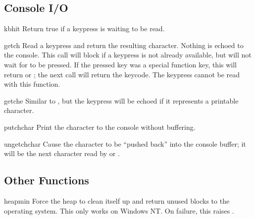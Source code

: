 \subsection{Console I/O \label{msvcrt-console}}

\begin{funcdesc}{kbhit}{}
  Return true if a keypress is waiting to be read.
\end{funcdesc}

\begin{funcdesc}{getch}{}
  Read a keypress and return the resulting character.  Nothing is
  echoed to the console.  This call will block if a keypress is not
  already available, but will not wait for  to be pressed.
  If the pressed key was a special function key, this will return
   or ; the next call will return the
  keycode.  The  keypress cannot be read with this
  function.
\end{funcdesc}

\begin{funcdesc}{getche}{}
  Similar to , but the keypress will be echoed if it 
  represents a printable character.
\end{funcdesc}

\begin{funcdesc}{putch}{char}
  Print the character  to the console without buffering.
\end{funcdesc}

\begin{funcdesc}{ungetch}{char}
  Cause the character  to be ``pushed back'' into the
  console buffer; it will be the next character read by
   or .
\end{funcdesc}


\subsection{Other Functions \label{msvcrt-other}}

\begin{funcdesc}{heapmin}{}
  Force the  heap to clean itself up and return
  unused blocks to the operating system.  This only works on Windows
  NT.  On failure, this raises .
\end{funcdesc}
